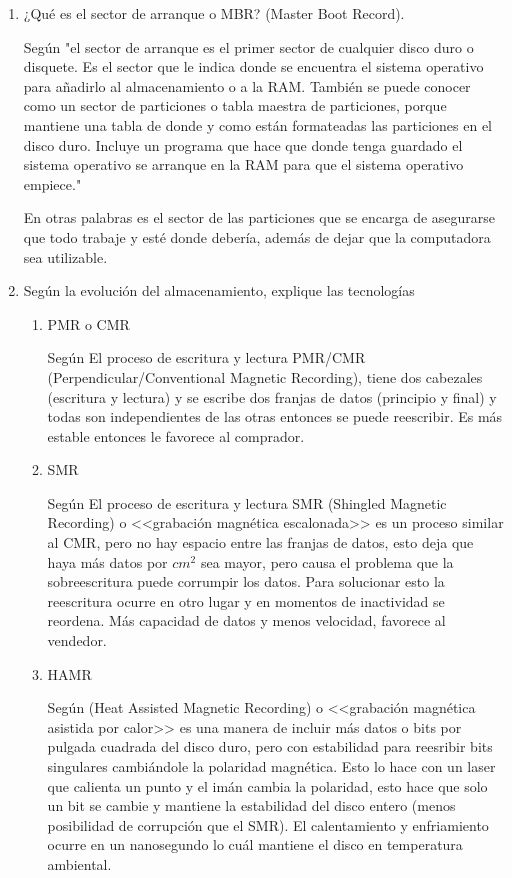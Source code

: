 \documentclass[stu, 12pt, letterpaper, donotrepeattitle, floatsintext, natbib, helv]{apa7}
\begin{document}
\begin{enumerate}
    \item ¿Qué es el sector de arranque o MBR? (Master Boot Record).
    
    Según \cite{MBRDefinition} "el sector de arranque es el primer sector de cualquier disco duro o disquete. Es el sector que le indica donde se encuentra el sistema operativo para añadirlo al almacenamiento o a la RAM. También se puede conocer como un sector de particiones o tabla maestra de particiones, porque mantiene una tabla de donde y como están formateadas las particiones en el disco duro. Incluye un programa que hace que donde tenga guardado el sistema operativo se arranque en la RAM para que el sistema operativo empiece."

    En otras palabras es el sector de las particiones que se encarga de asegurarse que todo trabaje y esté donde debería, además de dejar que la computadora sea utilizable.
    
    \item Según la evolución del almacenamiento, explique las tecnologías
    \begin{enumerate}
        \item PMR o CMR
        
        Según \cite{SMRCMPPMR} El proceso de escritura y lectura PMR/CMR (Perpendicular/Conventional Magnetic Recording), tiene dos cabezales (escritura y lectura) y se escribe dos franjas de datos (principio y final) y todas son independientes de las otras entonces se puede reescribir. Es más estable entonces le favorece al comprador.
        
        \item SMR
        
        Según \cite{SMRCMPPMR} El proceso de escritura y lectura SMR (Shingled Magnetic Recording) o <<grabación magnética escalonada>> es un proceso similar al CMR, pero no hay espacio entre las franjas de datos, esto deja que haya más datos por $cm^2$ sea mayor, pero causa el problema que la sobreescritura puede corrumpir los datos. Para solucionar esto la reescritura ocurre en otro lugar y en momentos de inactividad se reordena. Más capacidad de datos y menos velocidad, favorece al vendedor.
        
        \item HAMR
        
        Según \cite{HAMR} (Heat Assisted Magnetic Recording) o <<grabación magnética asistida por calor>> es una manera de incluir más datos o bits por pulgada cuadrada del disco duro, pero con estabilidad para reesribir bits singulares cambiándole la polaridad magnética. Esto lo hace con un laser que calienta un punto y el imán cambia la polaridad, esto hace que solo un bit se cambie y mantiene la estabilidad del disco entero (menos posibilidad de corrupción que el SMR). El calentamiento y enfriamiento ocurre en un nanosegundo lo cuál mantiene el disco en temperatura ambiental.
        

\end{enumerate}
\end{enumerate}
\end{document}
